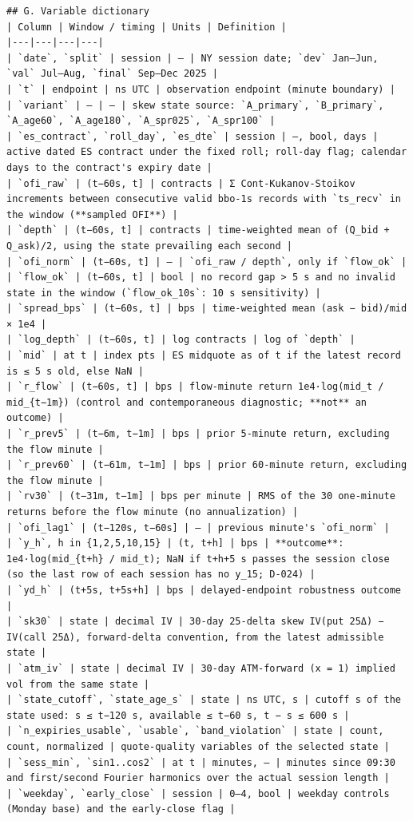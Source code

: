 \documentclass[11pt]{article}
\begin{document}
\begin{verbatim}
## G. Variable dictionary
| Column | Window / timing | Units | Definition |
|---|---|---|---|
| `date`, `split` | session | – | NY session date; `dev` Jan–Jun, `val` Jul–Aug, `final` Sep–Dec 2025 |
| `t` | endpoint | ns UTC | observation endpoint (minute boundary) |
| `variant` | – | – | skew state source: `A_primary`, `B_primary`, `A_age60`, `A_age180`, `A_spr025`, `A_spr100` |
| `es_contract`, `roll_day`, `es_dte` | session | –, bool, days | active dated ES contract under the fixed roll; roll-day flag; calendar days to the contract's expiry date |
| `ofi_raw` | (t−60s, t] | contracts | Σ Cont-Kukanov-Stoikov increments between consecutive valid bbo-1s records with `ts_recv` in the window (**sampled OFI**) |
| `depth` | (t−60s, t] | contracts | time-weighted mean of (Q_bid + Q_ask)/2, using the state prevailing each second |
| `ofi_norm` | (t−60s, t] | – | `ofi_raw / depth`, only if `flow_ok` |
| `flow_ok` | (t−60s, t] | bool | no record gap > 5 s and no invalid state in the window (`flow_ok_10s`: 10 s sensitivity) |
| `spread_bps` | (t−60s, t] | bps | time-weighted mean (ask − bid)/mid × 1e4 |
| `log_depth` | (t−60s, t] | log contracts | log of `depth` |
| `mid` | at t | index pts | ES midquote as of t if the latest record is ≤ 5 s old, else NaN |
| `r_flow` | (t−60s, t] | bps | flow-minute return 1e4·log(mid_t / mid_{t−1m}) (control and contemporaneous diagnostic; **not** an outcome) |
| `r_prev5` | (t−6m, t−1m] | bps | prior 5-minute return, excluding the flow minute |
| `r_prev60` | (t−61m, t−1m] | bps | prior 60-minute return, excluding the flow minute |
| `rv30` | (t−31m, t−1m] | bps per minute | RMS of the 30 one-minute returns before the flow minute (no annualization) |
| `ofi_lag1` | (t−120s, t−60s] | – | previous minute's `ofi_norm` |
| `y_h`, h in {1,2,5,10,15} | (t, t+h] | bps | **outcome**: 1e4·log(mid_{t+h} / mid_t); NaN if t+h+5 s passes the session close (so the last row of each session has no y_15; D-024) |
| `yd_h` | (t+5s, t+5s+h] | bps | delayed-endpoint robustness outcome |
| `sk30` | state | decimal IV | 30-day 25-delta skew IV(put 25Δ) − IV(call 25Δ), forward-delta convention, from the latest admissible state |
| `atm_iv` | state | decimal IV | 30-day ATM-forward (x = 1) implied vol from the same state |
| `state_cutoff`, `state_age_s` | state | ns UTC, s | cutoff s of the state used: s ≤ t−120 s, available ≤ t−60 s, t − s ≤ 600 s |
| `n_expiries_usable`, `usable`, `band_violation` | state | count, count, normalized | quote-quality variables of the selected state |
| `sess_min`, `sin1..cos2` | at t | minutes, – | minutes since 09:30 and first/second Fourier harmonics over the actual session length |
| `weekday`, `early_close` | session | 0–4, bool | weekday controls (Monday base) and the early-close flag |


\end{verbatim}
\end{document}

